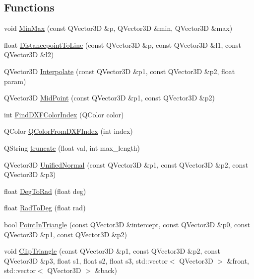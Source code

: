 \subsection*{Functions}
\begin{DoxyCompactItemize}
\item 
void \hyperlink{namespaceShipCAD_aa5d3fc63603d716d3e24244049e1e510}{Min\-Max} (const Q\-Vector3\-D \&p, Q\-Vector3\-D \&min, Q\-Vector3\-D \&max)
\item 
float \hyperlink{namespaceShipCAD_a69361fa79b1f818e21306f6266ee45d3}{Distancepoint\-To\-Line} (const Q\-Vector3\-D \&p, const Q\-Vector3\-D \&l1, const Q\-Vector3\-D \&l2)
\item 
Q\-Vector3\-D \hyperlink{namespaceShipCAD_a83f7c2b40959a0d02a2cc1085b0d07ee}{Interpolate} (const Q\-Vector3\-D \&p1, const Q\-Vector3\-D \&p2, float param)
\item 
Q\-Vector3\-D \hyperlink{namespaceShipCAD_ad1ad66c896fe763fb4603989ff1f1182}{Mid\-Point} (const Q\-Vector3\-D \&p1, const Q\-Vector3\-D \&p2)
\item 
int \hyperlink{namespaceShipCAD_a87efc267ae07a84fb1cd55a4562c2907}{Find\-D\-X\-F\-Color\-Index} (Q\-Color color)
\item 
Q\-Color \hyperlink{namespaceShipCAD_a9956eca83968462fc4c48c376a10d577}{Q\-Color\-From\-D\-X\-F\-Index} (int index)
\item 
Q\-String \hyperlink{namespaceShipCAD_a83d943939c1d84473bb904360116f7be}{truncate} (float val, int max\-\_\-length)
\item 
Q\-Vector3\-D \hyperlink{namespaceShipCAD_a81e47e31f89000550b007c0f9a4d09aa}{Unified\-Normal} (const Q\-Vector3\-D \&p1, const Q\-Vector3\-D \&p2, const Q\-Vector3\-D \&p3)
\item 
float \hyperlink{namespaceShipCAD_ac344c080c66b4394cb988cf88c726029}{Deg\-To\-Rad} (float deg)
\item 
float \hyperlink{namespaceShipCAD_a3ad1916db38fb61e8a053f944df49cee}{Rad\-To\-Deg} (float rad)
\item 
bool \hyperlink{namespaceShipCAD_ae1773f0e415446342401a67430a8b643}{Point\-In\-Triangle} (const Q\-Vector3\-D \&intercept, const Q\-Vector3\-D \&p0, const Q\-Vector3\-D \&p1, const Q\-Vector3\-D \&p2)
\item 
void \hyperlink{namespaceShipCAD_a36b9b33181823761bc327d66c36c8d8f}{Clip\-Triangle} (const Q\-Vector3\-D \&p1, const Q\-Vector3\-D \&p2, const Q\-Vector3\-D \&p3, float s1, float s2, float s3, std\-::vector$<$ Q\-Vector3\-D $>$ \&front, std\-::vector$<$ Q\-Vector3\-D $>$ \&back)

\end{DoxyCompactItemize}
